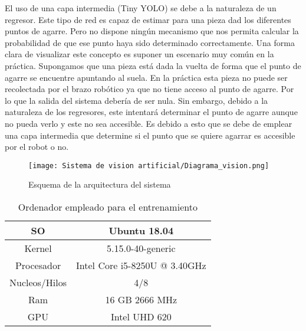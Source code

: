 El uso de una capa intermedia (Tiny YOLO) se debe a la naturaleza de un regresor. Este tipo de red es capaz de estimar para una pieza dad los diferentes puntos de agarre. Pero no dispone ningún mecanismo que nos permita calcular la probabilidad de que ese punto haya sido determinado correctamente. Una forma clara de visualizar este concepto es suponer un escenario muy común en la práctica. Supongamos que una pieza está dada la vuelta de forma que el punto de agarre se encuentre apuntando al suela. En la práctica esta pieza no puede ser recolectada por el brazo robótico ya que no tiene acceso al punto de agarre. Por lo que la salida del sistema debería de ser nula. Sin embargo, debido a la naturaleza de los regresores, este intentará determinar el punto de agarre aunque no pueda verlo y este no sea accesible. Es debido a esto que se debe de emplear una capa intermedia que determine si el punto que se quiere agarrar es accesible por el robot o no.

\begin{figure}[ht]
	\centering
	\texttt{[image: Sistema de vision artificial/Diagrama\_vision.png]}
	\caption{Esquema de la arquitectura del sistema}
	\label{chap:Sistema de visión artificial fig:Arquitectura generador}
\end{figure}

\vspace{5pt}
\begin{table}[ht]
	\centering
	\begin{tabular}{|c|c|}
	\hline 
	SO & Ubuntu 18.04 \\
	\hline
	Kernel &  5.15.0-40-generic \\
	\hline 
	Procesador & Intel Core i5-8250U @ 3.40GHz \\ 
	\hline 
	Nucleos/Hilos & 4/8 \\
	\hline
	Ram & 16 GB 2666 MHz\\ 
	\hline 
	GPU & Intel UHD 620 \\ 
	\hline 
	\end{tabular} 
	\caption{Ordenador empleado para el entrenamiento}
	\label{chap:Sistema de visión artificial tab:Ordenador}
\end{table}
\vspace{5pt}


